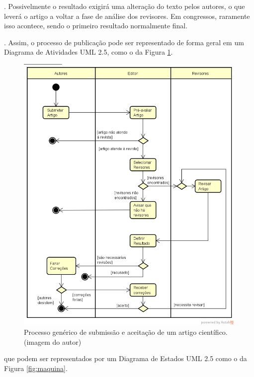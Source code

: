 \documentclass[openany]{book}
\begin{document}
. Possivelmente o resultado exigirá uma alteração do texto pelos autores, o que leverá o artigo a voltar a fase de análise dos revisores. Em congressos, raramente isso acontece, sendo o primeiro resultado normalmente final.

. Assim, o processo de publicação pode ser representado de forma geral em um Diagrama de Atividades UML 2.5, como o da Figura \ref{fig:processo}.


\begin{figure}
    \centering
    \includegraphics[width=0.7\linewidth]{imagens/ProcessoDeSubmissao.png}
    \caption[Processo genérico de submissão e aceitação de um artigo científico]{Processo genérico de submissão e aceitação de um artigo científico. (imagem do autor)}
    \label{fig:processo}
\end{figure}

 que podem ser representados por um Diagrama  de Estados UML 2.5 como o da Figura \ref{fig:maquina}.
\end{document}
